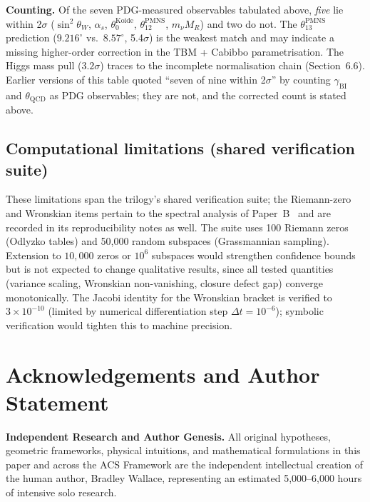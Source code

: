 \documentclass[11pt,a4paper]{article}
\theoremstyle{plain}
\theoremstyle{definition}
\theoremstyle{remark}
\begin{document}
\medskip
\noindent
\textbf{Counting.}  Of the seven PDG-measured observables tabulated above,
\emph{five} lie within 2$\sigma$ ($\sin^2\theta_W$, $\alpha_s$,
$\theta_0^{\mathrm{Koide}}$, $\theta_{12}^{\mathrm{PMNS}}$, $m_\nu M_R$) and two
do not.  The $\theta_{13}^{\mathrm{PMNS}}$ prediction ($9.216^\circ$ vs.\
$8.57^\circ$, 5.4$\sigma$) is the weakest match and may indicate a missing
higher-order correction in the TBM + Cabibbo parametrisation.  The Higgs mass
pull ($3.2\sigma$) traces to the incomplete normalisation chain
(Section~6.6).  Earlier versions of this table quoted ``seven of nine within
2$\sigma$'' by counting $\gamma_{\mathrm{BI}}$ and $\theta_{\mathrm{QCD}}$ as
PDG observables; they are not, and the corrected count is stated above.

\subsection*{Computational limitations (shared verification suite)}

These limitations span the trilogy's shared verification suite; the
Riemann-zero and Wronskian items pertain to the spectral analysis of
Paper~B~\cite{WallaceB} and are recorded in its reproducibility notes
as well.  The suite uses 100 Riemann zeros (Odlyzko tables) and
50{,}000 random subspaces (Grassmannian sampling).  Extension to
$10{,}000$ zeros or $10^6$ subspaces would strengthen confidence bounds
but is not expected to change qualitative results, since all tested
quantities (variance scaling, Wronskian non-vanishing, closure defect
gap) converge monotonically.  The Jacobi identity for the Wronskian
bracket is verified to $3 \times 10^{-10}$ (limited by numerical
differentiation step $\Delta t = 10^{-6}$); symbolic verification
would tighten this to machine precision.

\section*{Acknowledgements and Author Statement}

\noindent\textbf{Independent Research and Author Genesis.} 
All original hypotheses, geometric frameworks, physical intuitions, and mathematical formulations in this paper and across the ACS Framework are the independent intellectual creation of the human author, Bradley Wallace, representing an estimated 5,000--6,000 hours of intensive solo research.
\end{document}
